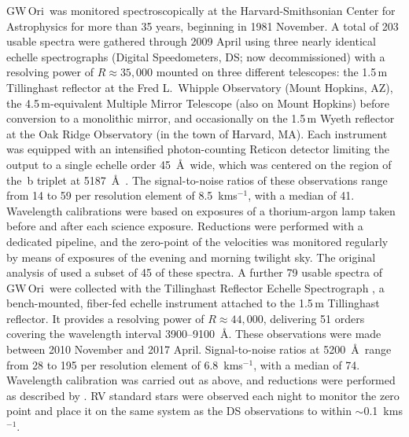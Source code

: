 \documentclass[twocolumn]{aastex61}
\newcommand\kms{\ifmmode{\rm km\thinspace s^{-1}}\else km\thinspace s$^{-1}$\fi}
\newcommand{\obj}{GW\,Ori}
\begin{document}
\obj\ was monitored spectroscopically at the Harvard-Smithsonian Center for Astrophysics for more than 35 years, beginning in 1981 November. A total of 203 usable spectra were gathered through 2009 April using three nearly identical echelle spectrographs (Digital Speedometers, DS; now decommissioned) with a resolving power of $R \approx 35,000$ mounted on three different telescopes: the 1.5\,m Tillinghast reflector at the Fred L.\ Whipple Observatory (Mount Hopkins, AZ), the 4.5\,m-equivalent Multiple Mirror Telescope (also on Mount Hopkins) before conversion to a monolithic mirror, and occasionally on the 1.5\,m Wyeth reflector at the Oak Ridge Observatory (in the town of Harvard, MA).  Each instrument was equipped with an intensified photon-counting Reticon detector limiting the output to a single echelle order 45~\AA\ wide, which was centered on the region of the \,b triplet at 5187~\AA\ \citep[see][]{latham92}. The signal-to-noise ratios of these observations range from 14 to 59 per resolution element of 8.5~\kms, with a median of 41. Wavelength calibrations were based on exposures of a thorium-argon lamp taken before and after each science exposure. Reductions were performed with a dedicated pipeline, and the zero-point of the velocities was monitored regularly by means of exposures of the evening and morning twilight sky. The original analysis of \cite{mathieu91} used a subset of 45 of these spectra. A further 79 usable spectra of \obj\ were collected with the Tillinghast Reflector Echelle Spectrograph \citep[TRES;][]{furesz08}, a bench-mounted, fiber-fed echelle instrument attached to the 1.5\,m Tillinghast reflector. It provides a resolving power of $R \approx 44,000$, delivering 51 orders covering the wavelength interval 3900--9100~\AA. These observations were made between 2010 November and 2017 April.  Signal-to-noise ratios at 5200~\AA\ range from 28 to 195 per resolution element of 6.8~\kms, with a median of 74. Wavelength calibration was carried out as above, and reductions were performed as described by \cite{buchhave10}. RV standard stars were observed each night to monitor the zero point and place it on the same system as the DS observations to within $\sim$0.1~\kms.
\end{document}
